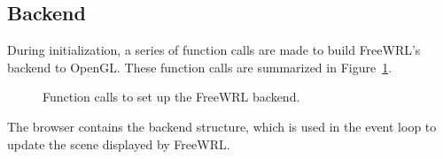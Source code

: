 \documentclass[12pt,letterpaper]{article}
\begin{document}
	\subsection{Backend}

	During initialization, a series of function calls are made to
	build FreeWRL's backend to OpenGL.
	These function calls are summarized in Figure~\ref{fig:be-setup}.

	\begin{figure}[!ht]
	    \centering
	    \caption{Function calls to set up the FreeWRL backend.}\label{fig:be-setup}
	\end{figure}

	The browser contains the backend structure, which is used in the event
	loop to update the scene displayed by FreeWRL.

	
	
\end{document}
